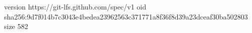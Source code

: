 version https://git-lfs.github.com/spec/v1
oid sha256:9d7f014b7c3043e4bedea23962563c371771a8f36f8d39a23dceaf30ba502803
size 582
